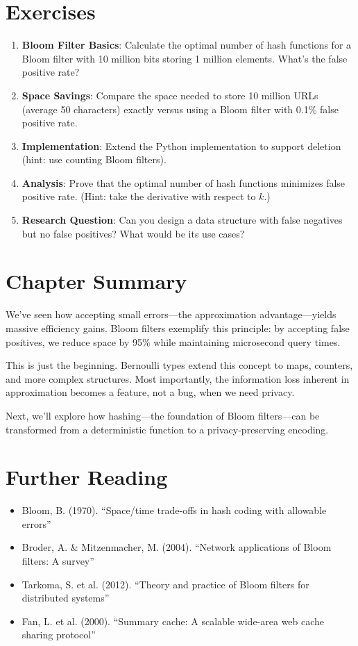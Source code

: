 \section{Exercises}

\begin{enumerate}
    \item \textbf{Bloom Filter Basics}: Calculate the optimal number of hash functions for a Bloom filter with 10 million bits storing 1 million elements. What's the false positive rate?
    
    \item \textbf{Space Savings}: Compare the space needed to store 10 million URLs (average 50 characters) exactly versus using a Bloom filter with 0.1\% false positive rate.
    
    \item \textbf{Implementation}: Extend the Python implementation to support deletion (hint: use counting Bloom filters).
    
    \item \textbf{Analysis}: Prove that the optimal number of hash functions minimizes false positive rate. (Hint: take the derivative with respect to $k$.)
    
    \item \textbf{Research Question}: Can you design a data structure with false negatives but no false positives? What would be its use cases?
\end{enumerate}

\section{Chapter Summary}

We've seen how accepting small errors—the approximation advantage—yields massive efficiency gains. Bloom filters exemplify this principle: by accepting false positives, we reduce space by 95\% while maintaining microsecond query times.

This is just the beginning. Bernoulli types extend this concept to maps, counters, and more complex structures. Most importantly, the information loss inherent in approximation becomes a feature, not a bug, when we need privacy.

Next, we'll explore how hashing—the foundation of Bloom filters—can be transformed from a deterministic function to a privacy-preserving encoding.

\section{Further Reading}

\begin{itemize}
\item Bloom, B. (1970). ``Space/time trade-offs in hash coding with allowable errors''
\item Broder, A. \& Mitzenmacher, M. (2004). ``Network applications of Bloom filters: A survey''
\item Tarkoma, S. et al. (2012). ``Theory and practice of Bloom filters for distributed systems''
\item Fan, L. et al. (2000). ``Summary cache: A scalable wide-area web cache sharing protocol''
\end{itemize}